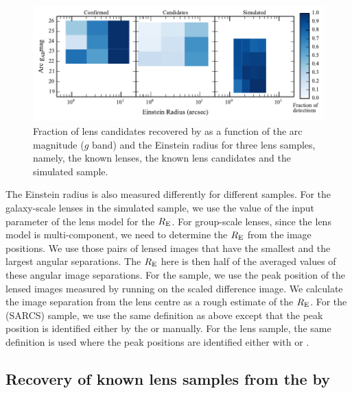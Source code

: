 \documentclass[useAMS,usenatbib,a4paper]{mn2e}
\begin{document}
\begin{figure}
\begin{center}
\includegraphics[scale=1.0]{comp_reinst_mag.pdf}
\caption{ \label{fig:compre} Fraction of lens candidates recovered by \sw as a
function of the arc magnitude ($g$ band) and the Einstein radius for three lens
samples, namely, the known lenses, the known lens candidates and the simulated
sample. }
\end{center}
\end{figure}

The Einstein radius is also measured differently for
different samples. For the galaxy-scale lenses in the simulated sample,
we use the value of the input parameter of the lens model for the $R_{\rm E}$.
For group-scale lenses, since the lens model is multi-component, we
need to determine the $R_{\rm E}$ from the image positions. We use those
pairs of lensed images that have the smallest and the largest angular
separations. The $R_{\rm E}$ here is then half of the averaged values of
these angular image separations. For the \rf sample, we use the peak
position of the lensed images measured by running \sextractor on
the scaled difference image. We calculate the image separation from the
lens centre as a rough estimate of the $R_{\rm E}$. For the \af (SARCS)
sample, we use the same definition as above except that the peak
position is identified either by the \af or manually. For the \sw lens
sample, the same definition is used where the peak positions are
identified either with \af or \sextractor.



\subsection{Recovery of known lens samples from the \cfhtls by \sw}
\label{sec:results:known}
\end{document}
